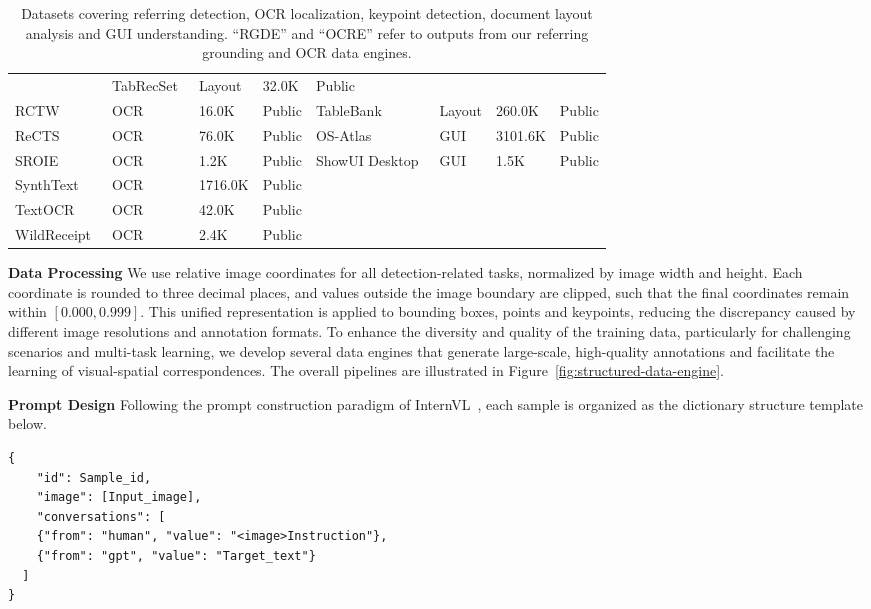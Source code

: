 \begin{table}[htbp]
\begin{tabular}{l|l|l|l||l|l|l|l}
        & TabRecSet~\cite{yang2023large} & Layout & 32.0K & Public \\
        RCTW~\cite{shi2017rctw} & OCR & 16.0K & Public
        & TableBank~\cite{li2019tablebank} & Layout & 260.0K & Public \\
        ReCTS~\cite{ReCTS} & OCR & 76.0K & Public
        & OS-Atlas~\cite{wu2024atlas} & GUI & 3101.6K & Public \\
        SROIE~\cite{SROIE} & OCR & 1.2K & Public
        & ShowUI Desktop~\cite{lin2024showui} & GUI & 1.5K & Public \\
        SynthText~\cite{Gupta16} & OCR & 1716.0K & Public & & & & \\
        TextOCR~\cite{singh2021textocr} & OCR & 42.0K & Public & & & & \\
        WildReceipt~\cite{sun2021spatial} & OCR & 2.4K & Public & & & & \\
        \bottomrule
    \end{tabular}
    \caption{Datasets covering referring detection, OCR localization, keypoint detection, document layout analysis and GUI understanding. “RGDE” and “OCRE” refer to outputs from our referring grounding and OCR data engines.}
    \label{tab:other-detection-datasets}
\end{table}

\textbf{Data Processing}
We use relative image coordinates for all detection-related tasks, normalized by image width and height.
Each coordinate is rounded to three decimal places, and values outside the image boundary are clipped, such that the final coordinates remain within $[0.000, 0.999]$.
This unified representation is applied to bounding boxes, points and keypoints, reducing the discrepancy caused by different image resolutions and annotation formats.
To enhance the diversity and quality of the training data, particularly for challenging scenarios and multi-task learning, we develop several data engines that generate large-scale, high-quality annotations and facilitate the learning of visual-spatial correspondences.
The overall pipelines are illustrated in Figure~\ref{fig:structured-data-engine}.

\textbf{Prompt Design}
Following the prompt construction paradigm of InternVL~\cite{Chen2023InternVS}, each sample is organized as the dictionary structure template below.

\begin{lstlisting}
{
    "id": Sample_id,
    "image": [Input_image],
    "conversations": [
    {"from": "human", "value": "<image>Instruction"},
    {"from": "gpt", "value": "Target_text"}
  ]
}
\end{lstlisting}

